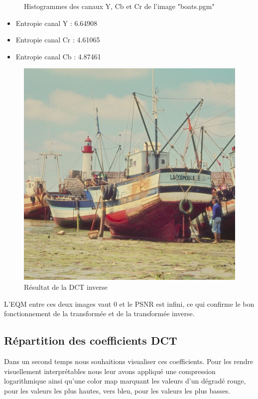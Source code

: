 \documentclass[12pt]{report}
\begin{document}
\begin{figure}[H]
\begin{center}
\caption{Histogrammes des canaux Y, Cb et Cr de l'image "boats.pgm"}
\end{center}
\end{figure}

\begin{itemize}
\item Entropie canal Y : 6.64908
\item Entropie canal Cr : 4.61065
\item Entropie canal Cb : 4.87461\\
\end{itemize}

\begin{figure}[H]
\begin{center}
\includegraphics[scale=0.5]{../ImageRes/idct_result.jpg} 
\caption{Résultat de la DCT inverse}
\end{center}
\end{figure}

L'EQM entre ces deux images vaut 0 et le PSNR est infini, ce qui confirme le bon fonctionnement de la transformée et de la transformée inverse.

\subsection{Répartition des coefficients DCT}
Dans un second temps nous souhaitions visualiser ces coefficients. Pour les rendre visuellement interprétables nous leur avons appliqué une compression logarithmique ainsi qu'une color map marquant les valeurs d'un dégradé rouge, pour les valeurs les plus hautes, vers bleu, pour les valeurs les plus basses.\\
\end{document}
